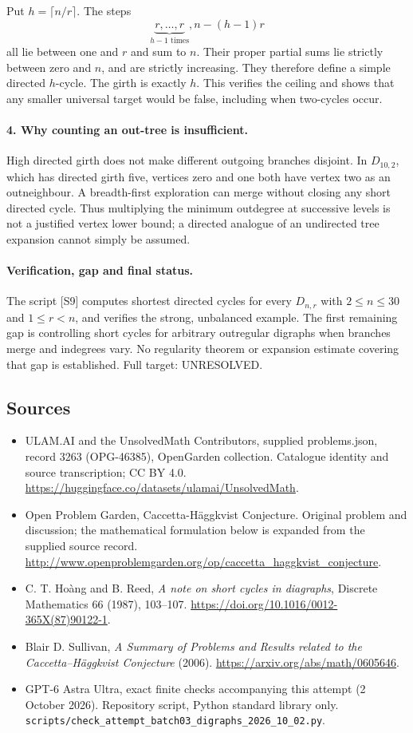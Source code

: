 \documentclass[11pt,a4paper]{article}
\begin{document}
Put $h=\lceil n/r\rceil$. The steps
\[
 \underbrace{r,\ldots,r}_{h-1\text{ times}},
                    n-(h-1)r
\]
all lie between one and $r$ and sum to $n$. Their proper partial
sums lie strictly between zero and $n$, and are strictly increasing.
They therefore define a simple directed $h$-cycle. The girth is
exactly $h$. This verifies the ceiling and shows that any smaller
universal target would be false, including when two-cycles occur.

\paragraph{4. Why counting an out-tree is insufficient.}
High directed girth does not make different outgoing branches
disjoint. In $D_{10,2}$, which has directed girth five, vertices zero
and one both have vertex two as an outneighbour. A breadth-first
exploration can merge without closing any short directed cycle.
Thus multiplying the minimum outdegree at successive levels is
not a justified vertex lower bound; a directed analogue of an
undirected tree expansion cannot simply be assumed.

\paragraph{Verification, gap and final status.}
The script [S9] computes shortest directed cycles for every
$D_{n,r}$ with $2\le n\le30$ and $1\le r<n$, and verifies the
strong, unbalanced example. The first remaining gap is controlling
short cycles for arbitrary outregular digraphs when branches merge
and indegrees vary. No regularity theorem or expansion estimate
covering that gap is established. Full target: UNRESOLVED.
\subsection{Sources}
\begin{itemize}
\item[S1] ULAM.AI and the UnsolvedMath Contributors, supplied problems.json, record 3263 (OPG-46385), OpenGarden collection. Catalogue identity and source transcription; CC BY 4.0.
\url{https://huggingface.co/datasets/ulamai/UnsolvedMath}.
\item[S2] Open Problem Garden, Caccetta-Häggkvist Conjecture. Original problem and discussion; the mathematical formulation below is expanded from the supplied source record.
\url{http://www.openproblemgarden.org/op/caccetta_haggkvist_conjecture}.
\item[S3] C. T. Ho\`ang and B. Reed, \emph{A note on short cycles in diagraphs}, Discrete Mathematics 66 (1987), 103--107. \url{https://doi.org/10.1016/0012-365X(87)90122-1}.
\item[S4] Blair D. Sullivan, \emph{A Summary of Problems and Results related to the Caccetta--H\"aggkvist Conjecture} (2006). \url{https://arxiv.org/abs/math/0605646}.
\item[S9] GPT-6 Astra Ultra, exact finite checks accompanying this attempt (2 October 2026). Repository script, Python standard library only. \texttt{scripts/check\_attempt\_batch03\_digraphs\_2026\_10\_02.py}.
\end{itemize}
\end{document}

